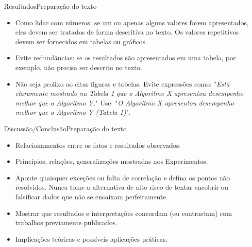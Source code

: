 \documentclass[t]{beamer}
\begin{document}
\begin{ftst}{Resultados}{Preparação do texto}
\justifying
\begin{itemize}
    \item Como lidar com números: se um ou apenas alguns valores forem apresentados, eles devem ser tratados de forma descritiva no texto. Os valores repetitivos devem ser fornecidos em tabelas ou gráficos.
    \vone
    \item Evite redundâncias: se os resultados são apresentados em uma tabela, por exemplo, não precisa ser descrito no texto.
    \vone
    \item Não seja prolixo ao citar figuras e tabelas. Evite expressões como: "\textit{Está claramente mostrado na Tabela 1 que o Algoritmo X apresentou desempenho melhor que o Algoritmo Y.}" Use: "\textit{O Algoritmo X apresentou desempenho melhor que o Algoritmo Y (Tabela 1)}".
\end{itemize}

\end{ftst}


\begin{ftst}{Discussão/Conclusão}{Preparação do texto}
\justifying
\begin{itemize}
    \item Relacionamentos entre os fatos e resultados observados.
    \vone
    \item Princípios, relações, generalizações mostradas nos Experimentos. 
    \vone
    \item Aponte quaisquer exceções ou falta de correlação e defina os pontos não resolvidos. Nunca tome a alternativa de alto risco de tentar encobrir ou falsificar dados que não se encaixam perfeitamente.
    \vone
    \item Mostrar que resultados e interpretações concordam (ou contrastam) com trabalhos previamente publicados.
    \vone
    \item Implicações teóricas e possíveis aplicações práticas.
\end{itemize}

\end{ftst}

\end{document}
